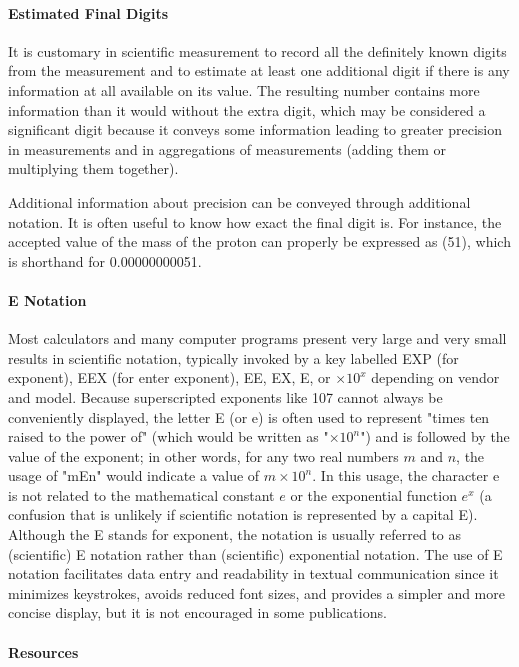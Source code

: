 \paragraph{Estimated Final Digits}

It is customary in scientific measurement to record all the definitely known digits from the measurement and to estimate at least one additional digit if there is any information at all available on its value. The resulting number contains more information than it would without the extra digit, which may be considered a significant digit because it conveys some information leading to greater precision in measurements and in aggregations of measurements (adding them or multiplying them together).

Additional information about precision can be conveyed through additional notation. It is often useful to know how exact the final digit is. For instance, the accepted value of the mass of the proton can properly be expressed as (51), which is shorthand for 0.00000000051.

\paragraph{E Notation}

Most calculators and many computer programs present very large and very small results in scientific notation, typically invoked by a key labelled EXP (for exponent), EEX (for enter exponent), EE, EX, E, or $\times 10^x$ depending on vendor and model. Because superscripted exponents like 107 cannot always be conveniently displayed, the letter E (or e) is often used to represent "times ten raised to the power of" (which would be written as "$\times 10^n$") and is followed by the value of the exponent; in other words, for any two real numbers $m$ and $n$, the usage of "mEn" would indicate a value of $m \times 10^n$. In this usage, the character e is not related to the mathematical constant $e$ or the exponential function $e^x$ (a confusion that is unlikely if scientific notation is represented by a capital E). Although the E stands for exponent, the notation is usually referred to as (scientific) E notation rather than (scientific) exponential notation. The use of E notation facilitates data entry and readability in textual communication since it minimizes keystrokes, avoids reduced font sizes, and provides a simpler and more concise display, but it is not encouraged in some publications.

\paragraph{Resources}


